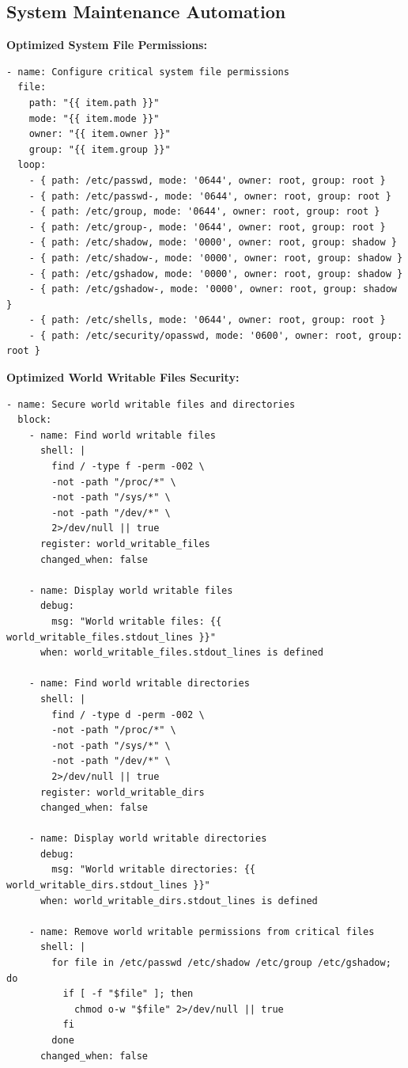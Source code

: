 \subsection{System Maintenance Automation}

\noindent \textbf{Optimized System File Permissions:}
\begin{verbatim}
- name: Configure critical system file permissions
  file:
    path: "{{ item.path }}"
    mode: "{{ item.mode }}"
    owner: "{{ item.owner }}"
    group: "{{ item.group }}"
  loop:
    - { path: /etc/passwd, mode: '0644', owner: root, group: root }
    - { path: /etc/passwd-, mode: '0644', owner: root, group: root }
    - { path: /etc/group, mode: '0644', owner: root, group: root }
    - { path: /etc/group-, mode: '0644', owner: root, group: root }
    - { path: /etc/shadow, mode: '0000', owner: root, group: shadow }
    - { path: /etc/shadow-, mode: '0000', owner: root, group: shadow }
    - { path: /etc/gshadow, mode: '0000', owner: root, group: shadow }
    - { path: /etc/gshadow-, mode: '0000', owner: root, group: shadow }
    - { path: /etc/shells, mode: '0644', owner: root, group: root }
    - { path: /etc/security/opasswd, mode: '0600', owner: root, group: root }
\end{verbatim}

\noindent \textbf{Optimized World Writable Files Security:}
\begin{verbatim}
- name: Secure world writable files and directories
  block:
    - name: Find world writable files
      shell: |
        find / -type f -perm -002 \
        -not -path "/proc/*" \
        -not -path "/sys/*" \
        -not -path "/dev/*" \
        2>/dev/null || true
      register: world_writable_files
      changed_when: false

    - name: Display world writable files
      debug:
        msg: "World writable files: {{ world_writable_files.stdout_lines }}"
      when: world_writable_files.stdout_lines is defined

    - name: Find world writable directories
      shell: |
        find / -type d -perm -002 \
        -not -path "/proc/*" \
        -not -path "/sys/*" \
        -not -path "/dev/*" \
        2>/dev/null || true
      register: world_writable_dirs
      changed_when: false

    - name: Display world writable directories
      debug:
        msg: "World writable directories: {{ world_writable_dirs.stdout_lines }}"
      when: world_writable_dirs.stdout_lines is defined

    - name: Remove world writable permissions from critical files
      shell: |
        for file in /etc/passwd /etc/shadow /etc/group /etc/gshadow; do
          if [ -f "$file" ]; then
            chmod o-w "$file" 2>/dev/null || true
          fi
        done
      changed_when: false
\end{verbatim}

